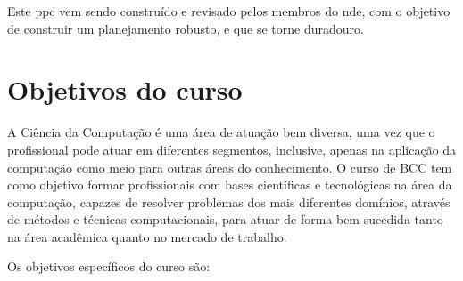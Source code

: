 \documentclass[
	12pt,				%
	openright,			%
  oneside,     %
	a4paper,			%
 hyphens,
	chapter=TITLE,		%
	english,			%
	french,				%
	spanish,			%
	brazil				%
	]{abntex2}
\begin{document}
Este \acrshort{ppc} vem sendo construído e revisado pelos membros do \acrshort{nde}, com o objetivo de construir um planejamento robusto, e que se torne duradouro. 




%
%


\chapter{Objetivos do curso}
\label{cap_objetivos_do_curso}

A Ciência da Computação é uma área de atuação bem diversa, uma vez que o profissional pode atuar em diferentes segmentos, inclusive, apenas na aplicação da computação como meio para outras áreas do conhecimento. O curso de BCC tem como objetivo formar profissionais com bases científicas e tecnológicas na área da computação, capazes de resolver problemas dos mais diferentes domínios, através de métodos e técnicas computacionais, para atuar de forma bem sucedida tanto na área acadêmica quanto no mercado de trabalho. 

Os objetivos específicos do curso são:
\end{document}
